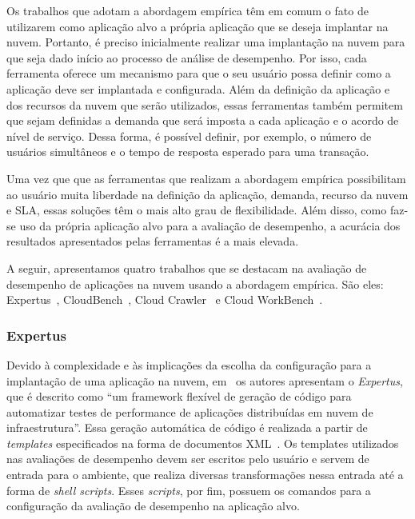 Os trabalhos que adotam a abordagem empírica têm em comum o fato de utilizarem como aplicação alvo a própria aplicação que se deseja implantar na nuvem. Portanto, é preciso inicialmente realizar uma implantação na nuvem para que seja dado início ao processo de análise de desempenho. Por isso, cada ferramenta oferece um mecanismo para que o seu usuário possa definir como a aplicação deve ser implantada e configurada. Além da definição da aplicação e dos recursos da nuvem que serão utilizados, essas ferramentas também permitem que sejam definidas a demanda que será imposta a cada aplicação e o acordo de nível de serviço. Dessa forma, é possível definir, por exemplo, o número de usuários simultâneos e o tempo de resposta esperado para uma transação.

Uma vez que que as ferramentas que realizam a abordagem empírica possibilitam ao usuário muita liberdade na definição da aplicação, demanda, recurso da nuvem e SLA, essas soluções têm o mais alto grau de flexibilidade. Além disso, como faz-se uso da própria aplicação alvo para a avaliação de desempenho, a acurácia dos resultados apresentados pelas ferramentas é a mais elevada. 

A seguir, apresentamos quatro trabalhos que se destacam na avaliação de desempenho de aplicações na nuvem usando a abordagem empírica. São eles: Expertus~\cite{jayasinghe2012}, CloudBench~\cite{silva2013cloudbench}, Cloud Crawler~\cite{cunhacloud} e Cloud WorkBench~\cite{scheuner2014cloud}.

\subsubsection{Expertus}
Devido à complexidade e às implicações da escolha da configuração para a implantação de uma aplicação na nuvem, em~\cite{jayasinghe2012} os autores apresentam o \textit{Expertus}, que é descrito como ``um framework flexível de geração de código para automatizar testes de performance de aplicações distribuídas em nuvem de infraestrutura''. Essa geração automática de código é realizada a partir de {\em templates} especificados na forma de documentos XML~\cite{jayasinghe2012}. Os templates utilizados nas avaliações de desempenho devem ser escritos pelo usuário e servem de entrada para o ambiente, que realiza diversas transformações nessa entrada até a forma de \textit{shell scripts}. Esses \textit{scripts}, por fim, possuem os comandos para a configuração da avaliação de desempenho na aplicação alvo.

